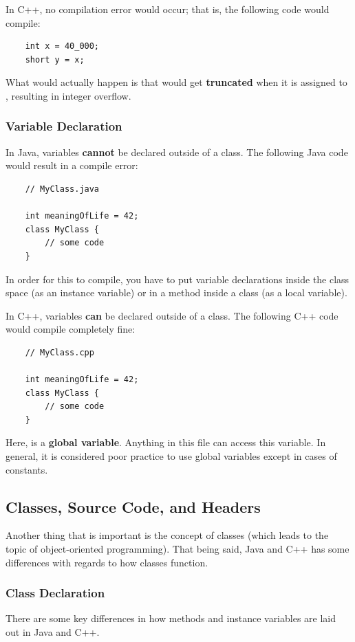 \documentclass[letterpaper]{article}
\begin{document}
\bigskip 

In C++, no compilation error would occur; that is, the following code would compile:
\begin{verbatim}
    int x = 40_000;
    short y = x;
\end{verbatim}
What would actually happen is that  would get \textbf{truncated} when it is assigned to , resulting in integer overflow. 


\subsubsection{Variable Declaration}
In Java, variables \textbf{cannot} be declared outside of a class. The following Java code would result in a compile error:
\begin{verbatim}
    // MyClass.java 

    int meaningOfLife = 42;
    class MyClass {
        // some code 
    }
\end{verbatim}
In order for this to compile, you have to put variable declarations inside the class space (as an instance variable) or in a method inside a class (as a local variable). 

\bigskip 

In C++, variables \textbf{can} be declared outside of a class. The following C++ code would compile completely fine: 
\begin{verbatim}
    // MyClass.cpp

    int meaningOfLife = 42;
    class MyClass {
        // some code 
    }
\end{verbatim}
Here,  is a \textbf{global variable}. Anything in this file can access this variable. In general, it is considered poor practice to use global variables except in cases of constants. 

\subsection{Classes, Source Code, and Headers}
Another thing that is important is the concept of classes (which leads to the topic of object-oriented programming). That being said, Java and C++ has some differences with regards to how classes function. 

\subsubsection{Class Declaration}
There are some key differences in how methods and instance variables are laid out in Java and C++. 
\end{document}

